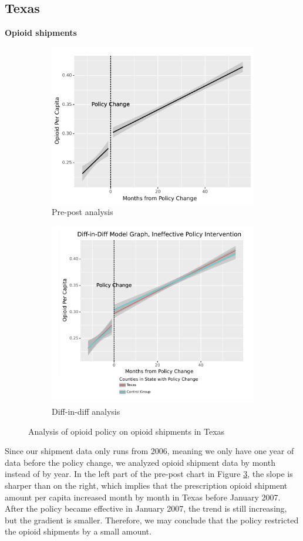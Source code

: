 \documentclass[12pt,letterpaper]{article}
\begin{document}
\subsection{Texas}
\textbf{Opioid shipments}

\begin{figure}[!h]
\centering
\begin{subfigure}{.5\textwidth}
  \centering
  \includegraphics[width=0.7\linewidth]{../30_results/Bonus_Results/tx_monthly_prepost_successful.png}
  \caption{Pre-post analysis}
  \label{fig:tx_ship_prepost}
\end{subfigure}%
\begin{subfigure}{.55\textwidth}
  \centering
  \includegraphics[width=0.7\linewidth]{../30_results/Bonus_Results/tx_monthly_did_notsure.png}
  \caption{Diff-in-diff analysis}
  \label{fig:tx_ship_did}
\end{subfigure}
\caption{Analysis of opioid policy on opioid shipments in Texas}
\label{fig:tx_ship}
\end{figure}
Since our shipment data only runs from 2006, meaning we only have one year of data before the policy change, we analyzed opioid shipment data by month instead of by year. In the left part of the pre-post chart in Figure \ref{fig:tx_ship}, the slope is sharper than on the right, which implies that the prescription opioid shipment amount per capita increased month by month in Texas before January 2007. After the policy became effective in January 2007, the trend is still increasing, but the gradient is smaller. Therefore, we may conclude that the policy restricted the opioid shipments by a small amount.
\end{document}
